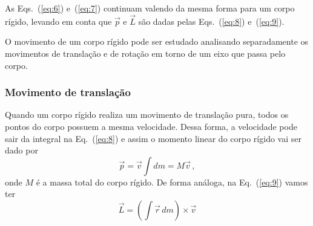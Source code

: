 \documentclass[twocolumn=on,DIV=calc]{scrartcl}
\newcommand{\dpar}[1]{\left(#1\right)}
\theoremstyle{definition}
\begin{document}
As Eqs.~(\ref{eq:6}) e~(\ref{eq:7}) continuam valendo da mesma
forma para um corpo rígido, levando em conta que $\vec p$ e $\vec L$
são dadas pelas Eqs.~(\ref{eq:8}) e~(\ref{eq:9}).

O movimento de um corpo rígido pode ser estudado analisando
separadamente os movimentos de translação e de rotação em torno de um
eixo que passa pelo corpo.

\subsubsection{Movimento de translação}
Quando um corpo rígido realiza um movimento de translação pura, todos
os pontos do corpo possuem a mesma velocidade. Dessa forma, a
velocidade pode sair da integral na Eq.~(\ref{eq:8}) e assim o momento
linear do corpo rígido vai ser dado por
$$\vec p=\vec v\int dm=M\vec v\,,$$
onde $M$ é a massa total do corpo rígido. De forma análoga, na
Eq.~(\ref{eq:9}) vamos ter
$$\vec L=\dpar{\int \vec r\,dm}\times\vec v$$
\end{document}
